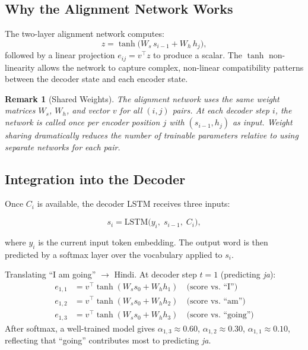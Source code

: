 \documentclass[12pt,a4paper]{article}
\newtheorem{remark}{Remark}[section]
\begin{document}
\subsection{Why the Alignment Network Works}

The two-layer alignment network computes:
\begin{equation}
  z = \tanh\!\bigl(W_s\, s_{i-1} + W_h\, h_j\bigr),
  \label{eq:align-hidden}
\end{equation}
followed by a linear projection $e_{ij} = v^{\top} z$ to produce a
scalar.  The $\tanh$ non-linearity allows the network to capture
complex, non-linear compatibility patterns between the decoder state
and each encoder state.

\begin{remark}[Shared Weights]
\label{rem:shared}
The alignment network uses the \emph{same} weight matrices
$W_s$, $W_h$, and vector $v$ for all $(i, j)$ pairs.  At each
decoder step $i$, the network is called once per encoder position $j$
with $(s_{i-1}, h_j)$ as input.  Weight sharing dramatically reduces
the number of trainable parameters relative to using separate networks
for each pair.
\end{remark}

\subsection{Integration into the Decoder}

Once $C_i$ is available, the decoder LSTM receives three inputs:

\begin{equation}
  s_i = \mathrm{LSTM}\!\bigl(y_i,\; s_{i-1},\; C_i\bigr),
  \label{eq:decoder-with-attn}
\end{equation}

where $y_i$ is the current input token embedding.  The output word is
then predicted by a softmax layer over the vocabulary applied to $s_i$.

\begin{example}[title=Machine Translation at $t=1$]
  Translating ``I am going'' $\to$ Hindi.  At decoder step $t=1$
  (predicting \textit{ja}):
  \begin{align*}
    e_{1,1} &= v^{\top} \tanh(W_s s_0 + W_h h_1)
               \quad \text{(score vs.\ ``I'')}      \\
    e_{1,2} &= v^{\top} \tanh(W_s s_0 + W_h h_2)
               \quad \text{(score vs.\ ``am'')}     \\
    e_{1,3} &= v^{\top} \tanh(W_s s_0 + W_h h_3)
               \quad \text{(score vs.\ ``going'')}
  \end{align*}
  After softmax, a well-trained model gives
  $\alpha_{1,3} \approx 0.60$, $\alpha_{1,2} \approx 0.30$,
  $\alpha_{1,1} \approx 0.10$, reflecting that ``going'' contributes
  most to predicting \textit{ja}.
\end{example}
\end{document}
